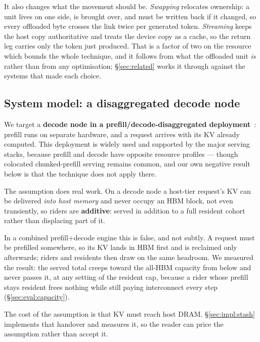 It also changes what the movement should be. \emph{Swapping} relocates
ownership: a unit lives on one side, is brought over, and must be written back
if it changed, so every offloaded byte crosses the link twice per generated
token. \emph{Streaming} keeps the host copy authoritative and treats the device
copy as a cache, so the return leg carries only the token just produced. That is
a factor of two on the resource which bounds the whole technique, and it follows
from what the offloaded unit \emph{is} rather than from any optimisation;
\S\ref{sec:related} works it through against the systems that made each choice.

\subsection{System model: a disaggregated decode node}
\label{sec:background:pd}

We target a \textbf{decode node in a prefill/decode-disaggregated
deployment}~\cite{distserve,splitwise,mooncake}: prefill runs on separate
hardware, and a request arrives with its KV already computed. This deployment is
widely used and supported by the major serving stacks, because prefill and
decode have opposite resource profiles --- though colocated chunked-prefill
serving remains common, and our own negative result below is that the technique
does not apply there.

The assumption does real work. On a decode node a host-tier request's KV can be
delivered \emph{into host memory} and never occupy an HBM block, not even
transiently, so riders are \textbf{additive}: served in addition to a full
resident cohort rather than displacing part of it.

In a combined prefill+decode engine this is false, and not subtly. A request
must be prefilled somewhere, so its KV lands in HBM first and is reclaimed only
afterwards; riders and residents then draw on the same headroom. We measured the
result: the served total creeps toward the all-HBM capacity from below and never
passes it, at any setting of the resident cap, because a rider whose prefill
stays resident frees nothing while still paying interconnect every step
(\S\ref{sec:eval:capacity}).

The cost of the assumption is that KV must reach host DRAM.
\S\ref{sec:impl:stash} implements that handover and measures it, so the reader
can price the assumption rather than accept it.

